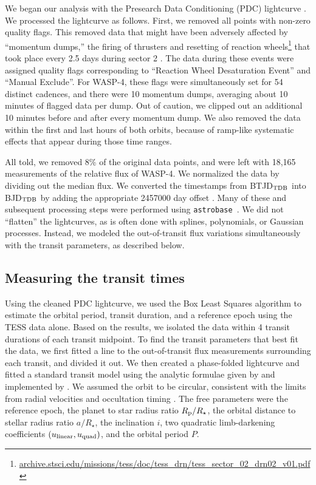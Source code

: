 \documentclass[12pt,twocolumn,tighten]{aastex62}
\begin{document}
We began our analysis with the Presearch Data Conditioning (PDC)
lightcurve \citep{smith_kepler_apertures_2017,smith_kepler_PDC_2017}.
We processed the lightcurve as follows.  First, we removed all points
with non-zero quality flags.  This removed data that might have been
adversely affected by ``momentum dumps,'' the firing of thrusters and
resetting of reaction
wheels\footnote{\url{archive.stsci.edu/missions/tess/doc/tess_drn/tess_sector_02_drn02_v01.pdf}}
that took place every 2.5 days during sector 2
\citep{tess_data_product_description_2018}.  The data during these
events were assigned quality flags corresponding to ``Reaction Wheel
Desaturation Event'' and ``Manual Exclude''.  For WASP-4, these flags
were simultaneously set for 54 distinct cadences, and there were 10
momentum dumps, averaging about 10 minutes of flagged data per dump.
Out of caution, we clipped out an additional 10 minutes before and
after every momentum dump.  We also removed the data within the first
and last hours of both orbits, because of ramp-like systematic effects
that appear during those time ranges. 

All told, we removed 8\% of the original data points, and were left
with 18{,}165 measurements of the relative flux of WASP-4.  We
normalized the data by dividing out the median flux.  We converted the
timestamps from BTJD$_{\rm TDB}$ into BJD$_{\rm TDB}$ by adding the
appropriate 2457000 day offset
\citep{tess_data_product_description_2018}.  Many of these and
subsequent processing steps were performed using
\texttt{astrobase}~\citep{bhatti_astrobase_2018}. We did not
``flatten'' the lightcurves, as is often done with splines,
polynomials, or Gaussian processes.  Instead, we modeled the
out-of-transit flux variations simultaneously with the transit
parameters, as described below.

\subsection{Measuring the transit times}
\label{sec:measurement}

Using the cleaned PDC lightcurve, we used the Box Least Squares
algorithm \citep{kovacs_box-fitting_2002} to estimate the orbital
period, transit duration, and a reference epoch using the TESS data
alone.  Based on the results, we isolated the data within 4 transit
durations of each transit midpoint.  To find the transit parameters
that best fit the data, we first fitted a line to the out-of-transit
flux measurements surrounding each transit, and divided it out.  We
then created a phase-folded lightcurve and fitted a standard transit
model using the analytic formulae given by
\citet{mandel_analytic_2002} and implemented by
\citet{kreidberg_batman_2015}.  We assumed the orbit to be circular,
consistent with the limits from radial velocities and occultation
timing
\citep{beerer_secondary_2011,knutson_friends_2014,bonomo_gaps_2017}.
The free parameters were the reference epoch, the planet to star
radius ratio $R_{\rm p}/R_\star$, the orbital distance to stellar
radius ratio $a/R_\star$, the inclination $i$, two quadratic
limb-darkening coefficients $(u_{\rm linear}, u_{\rm quad})$, and the
orbital period $P$.
\end{document}
